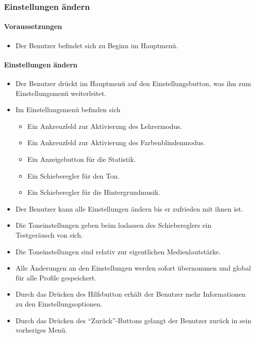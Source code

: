 \subsubsection{Einstellungen ändern}
\paragraph{Voraussetzungen}
\begin{itemize}
	\item Der Benutzer befindet sich zu Beginn im Hauptmenü.
\end{itemize}
\paragraph{Einstellungen ändern}
\begin{itemize}
	\item Der Benutzer drückt im Hauptmenü auf den Einstellungsbutton, was ihn zum Einstellungsmenü weiterleitet.
	\item Im Einstellungsmenü befinden sich
	\begin{itemize}
		\item Ein Ankreuzfeld zur Aktivierung des Lehrermodus.
		\item Ein Ankreuzfeld zur Aktivierung des Farbenblindenmodus.
		\item Ein Anzeigebutton für die Statistik.
		\item Ein Schieberegler für den Ton.
		\item Ein Schieberegler für die Hintergrundmusik.
	\end{itemize}
	\item Der Benutzer kann alle Einstellungen ändern bis er zufrieden mit ihnen ist.
	\item Die Toneinstellungen geben beim loslassen des Schiebereglers ein Testgeräusch von sich.
	\item Die Toneinstellungen sind relativ zur eigentlichen Medienlautstärke.
	\item Alle Änderungen an den Einstellungen werden sofort übernommen und global für alle Profile gespeichert.
	\item Durch das Drücken des Hilfsbutton erhält der Benutzer mehr Informationen zu den Einstellungsoptionen.
	\item Durch das Drücken des "`Zurück"'-Buttons gelangt der Benutzer zurück in sein vorheriges Menü.
\end{itemize}


